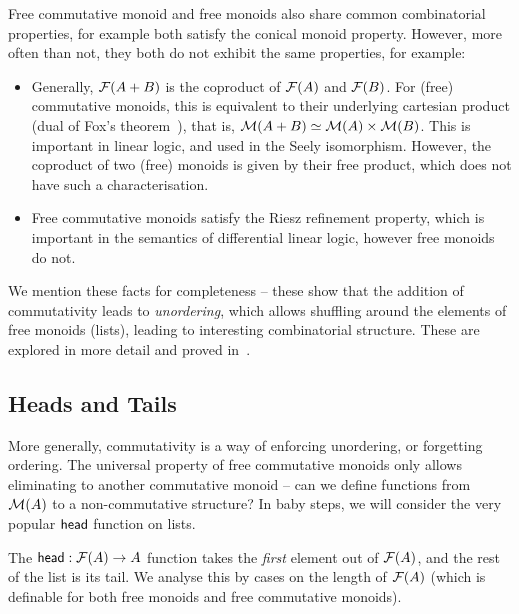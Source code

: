Free commutative monoid and free monoids also share common combinatorial properties, for example both satisfy the
conical monoid property.
%
However, more often than not, they both do not exhibit the same properties, for example:
\begin{itemize}
    \item
          Generally, $\mathcal{F}(A + B)$ is the coproduct of $\mathcal{F}(A)$ and $\mathcal{F}(B)$.
          For (free) commutative monoids, this is equivalent to
          their underlying cartesian product
          (dual of Fox's theorem~\cite{foxCoalgebrasCartesianCategories1976}),
          that is, $\mathcal{M}(A + B) \mathrel{\simeq} \mathcal{M}(A) \times \mathcal{M}(B)$.
          This is important in linear logic, and used in the Seely isomorphism.
          However, the coproduct of two (free) monoids is given by their free product,
          which does not have such a characterisation.
    \item Free commutative monoids satisfy the Riesz refinement property,
          which is important in the semantics of differential linear logic,
          however free monoids do not.
\end{itemize}
We mention these facts for completeness -- these show that the addition of commutativity leads to \emph{unordering},
which allows shuffling around the elements of free monoids (lists), leading to interesting combinatorial structure.
%
These are explored in more detail and proved in~\cite{choudhuryFreeCommutativeMonoids2023}.

\subsection{Heads and Tails}\label{sec:head}

More generally, commutativity is a way of enforcing unordering, or forgetting ordering.
%
The universal property of free commutative monoids only allows eliminating to another commutative monoid --
can we define functions from $\mathcal{M}(A)$ to a non-commutative structure?
%
In baby steps, we will consider the very popular $\operatorname{\mathsf{head}}$ function on lists.

The $\operatorname{\mathsf{head}} : \mathcal{F}(A) \to A$ function takes the \emph{first} element out of $\mathcal{F}(A)$, and the rest of the list is
its tail.
%
We analyse this by cases on the length of $\mathcal{F}(A)$
(which is definable for both free monoids and free commutative monoids).

